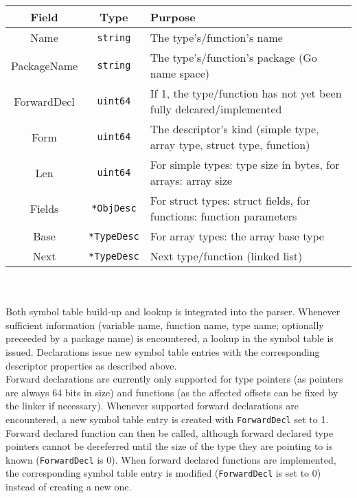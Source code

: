 \documentclass[a4paper]{scrreprt}
\begin{document}
      \begin{tabular}{|c|c|l|}
        \hline
        \textbf{Field} & \textbf{Type} & \textbf{Purpose}\\ \hline
        Name & \texttt{string} & The type's/function's name\\ \hline
        PackageName & \texttt{string} & The type's/function's package (Go name space)\\ \hline
        ForwardDecl & \texttt{uint64} & If 1, the type/function has not yet been fully delcared/implemented\\ \hline
        Form & \texttt{uint64} & The descriptor's kind (simple type, array type, struct type, function)\\ \hline
        Len & \texttt{uint64} & For simple types: type size in bytes, for arrays: array size\\ \hline
        Fields & \texttt{*ObjDesc} & For struct types: struct fields, for functions: function parameters\\ \hline
        Base & \texttt{*TypeDesc} & For array types: the array base type\\ \hline
        Next & \texttt{*TypeDesc} & Next type/function (linked list)\\ \hline
      \end{tabular}\\ \\
    Both symbol table build-up and lookup is integrated into the parser. Whenever sufficient information (variable name, function name, type name; optionally preceeded by a package name) is encountered, a lookup in the symbol table is issued. Declarations issue new symbol table entries with the corresponding descriptor properties as described above.\\
    Forward declarations are currently only supported for type pointers (as pointers are always 64 bits in size) and functions (as the affected offsets can be fixed by the linker if necessary). Whenever supported forward declarations are encountered, a new symbol table entry is created with \texttt{ForwardDecl} set to 1. Forward declared function can then be called, although forward declared type pointers cannot be dereferred until the size of the type they are pointing to is known (\texttt{ForwardDecl} is 0). When forward declared functions are implemented, the corresponding symbol table entry is modified (\texttt{ForwardDecl} is set to 0) instead of creating a new one.
      
\end{document}
